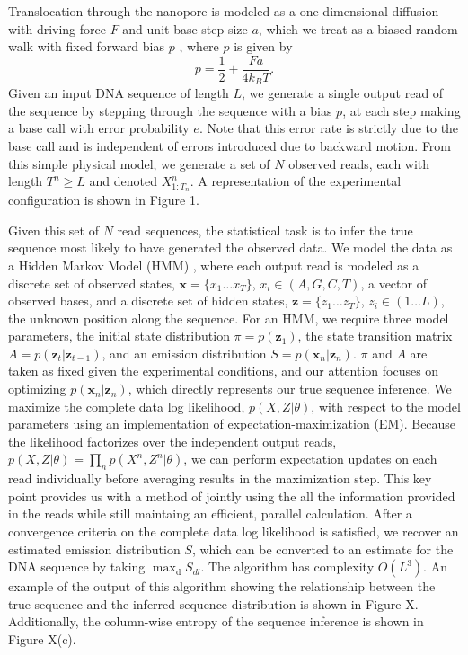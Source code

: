 \documentclass{biophys_letter}
\begin{document}
\begin{multicols}{2}
Translocation through the nanopore is modeled as a one-dimensional diffusion with driving force $F$ and unit base step size $a$, which we treat as a biased random walk with fixed forward bias $p$ \cite{Berg:1993}, where $p$ is given by
\begin{equation}
p = \frac{1}{2} + \frac{Fa}{4k_{B}T}.
\end{equation}
Given an input DNA sequence of length $L$, we generate a single output read of the sequence by stepping through the sequence with a bias $p$, at each step making a base call with error probability $e$.
Note that this error rate is strictly due to the base call and is independent of errors introduced due to backward motion. 
From this simple physical model, we generate a set of $N$ observed reads, each with length $T^{n} \ge L$ and denoted $X^n_{1:T_n}$.
A representation of the experimental configuration is shown in Figure 1.

Given this set of $N$ read sequences, the statistical task is to infer the true sequence most likely to have generated the observed data.
We model the data as a Hidden Markov Model (HMM) \cite{Rabiner:1989}, where each output read is modeled as a discrete set of observed states, $\mathbf{x}=\{x_{1}\dots x_{T}\}$, $x_i \in (A,G,C,T)$, a vector of observed bases, and a discrete set of hidden states, $\mathbf{z}=\{z_{1} \dots z_{T}\}$, $z_i \in (1 \dots L)$, the unknown position along the sequence.
For an HMM, we require three model parameters, the initial state distribution $\pi=p(\mathbf{z}_{1})$, the state transition matrix $A=p(\mathbf{z}_{t}|\mathbf{z}_{t-1})$, and an emission distribution $S=p(\mathbf{x}_{n}|\mathbf{z}_{n})$. 
$\pi$ and $A$ are taken as fixed given the experimental conditions, and our attention focuses on optimizing $p(\mathbf{x}_{n}|\mathbf{z}_{n})$, which directly represents our true sequence inference.
We maximize the complete data log likelihood, $p(X,Z|\theta)$, with respect to the model parameters using an implementation of expectation-maximization (EM).
Because the likelihood factorizes over the independent output reads, $p(X,Z|\theta)=\prod_{n}p(X^n,Z^n|\theta)$, we can perform expectation updates on each read individually before averaging results in the maximization step.
This key point provides us with a method of jointly using the all the information provided in the reads while still maintaing an efficient, parallel calculation.
After a convergence criteria on the complete data log likelihood is satisfied, we recover an estimated emission distribution $S$, which can be converted to an estimate for the DNA sequence by taking $\mathrm{\max_{d}} {S_{dl}}$.
The algorithm has complexity $O(L^{3})$.
An example of the output of this algorithm showing the relationship between the true sequence and the inferred sequence distribution is shown in Figure X.
Additionally, the column-wise entropy of the sequence inference is shown in Figure X(c).


\end{multicols}
\end{document}
